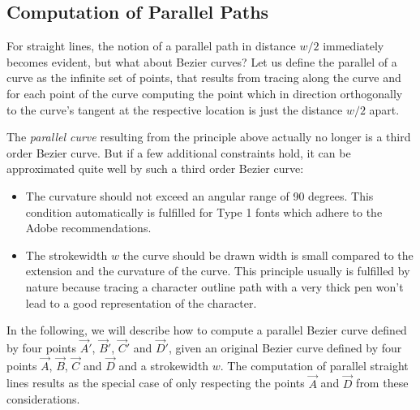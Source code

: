\subsection{Computation of Parallel Paths}
\label{parallelpaths}%
For straight lines, the notion of a parallel path in distance $w/2$ immediately
becomes evident, but what about Bezier curves? Let us define the parallel of a
curve as the infinite set of points, that results from tracing along the
curve and for each point of the curve computing the point which in direction
orthogonally to the curve's tangent at the respective location is just the
distance $w/2$ apart.

The {\em parallel curve} resulting from the principle above actually no longer
is a third order Bezier curve. But if a few additional constraints hold, it
can be approximated quite well by such a third order Bezier curve:
\begin{itemize}
\item The curvature should not exceed an angular range of 90 degrees. This
  condition automatically is fulfilled for Type 1 fonts which adhere to the
  Adobe recommendations.
\item The strokewidth $w$ the curve should be drawn width is small compared to
  the extension and the curvature of the curve. This principle usually is
  fulfilled by nature because tracing a character outline path with a very
  thick pen won't lead to a good representation of the character.
\end{itemize}
In the following, we will describe how to compute a parallel Bezier curve
defined by four points $\vec{A}'$, $\vec{B}'$, $\vec{C}'$ and $\vec{D}'$,
given an original Bezier curve defined by four points $\vec{A}$, $\vec{B}$,
$\vec{C}$ and $\vec{D}$ and a strokewidth $w$. The computation of parallel
straight lines results as the special case of only respecting the points
$\vec{A}$ and $\vec{D}$ from these considerations. 


